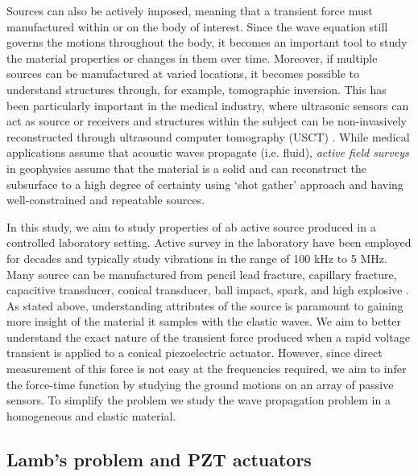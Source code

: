 \documentclass[preprint,3p, 11pt,authoryear]{elsarticle}
\begin{document}
Sources can also be actively imposed, meaning that a transient force must manufactured within or on the body of interest. Since the wave equation still governs the motions throughout the body, it becomes an important tool to study the material properties or changes in them over time. Moreover, if multiple sources can be manufactured at varied locations, it becomes possible to understand structures through, for example, tomographic inversion.  This has been particularly important in the medical industry, where ultrasonic sensors can act as source or receivers and structures within the subject can be non-invasively reconstructed through ultrasound computer tomography (USCT) \citep[e.g.][]{Christensen1988}. While medical applications assume that acoustic waves propagate (i.e. fluid), \textit{active field surveys} in geophysics assume that the material is a solid and can reconstruct the subsurface to a high degree of certainty using `shot gather' approach and having well-constrained and repeatable sources.

In this study, we aim to study properties of ab active source produced in a controlled laboratory setting. Active survey in the laboratory have been employed for decades and typically study vibrations in the range of 100 kHz to 5 MHz. Many source can be manufactured from pencil lead fracture, capillary fracture, capacitive transducer, conical transducer, ball impact, spark, and high explosive \citep{Breckenridge1990}. As stated above, understanding attributes of the source is paramount to gaining more insight of the material it samples with the elastic waves. We aim to better understand the exact nature of the transient force produced when a rapid voltage transient is applied to a conical piezoelectric actuator. However, since direct measurement of this force is not easy at the frequencies required, we aim to infer the force-time function by studying the ground motions on an array of passive sensors. To simplify the problem we study the wave propagation problem in a homogeneous and elastic material.

\subsection{Lamb's problem and PZT actuators}
\end{document}

